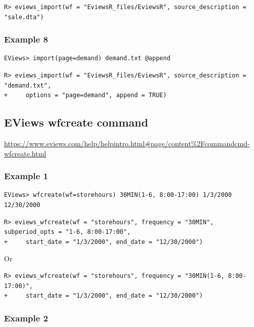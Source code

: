 \begin{verbatim}
R> eviews_import(wf = "EviewsR_files/EviewsR", source_description = "sale.dta")
\end{verbatim}

\hypertarget{example-8-1}{%
\subsubsection{Example 8}\label{example-8-1}}

\begin{verbatim}
EViews> import(page=demand) demand.txt @append
\end{verbatim}

\begin{verbatim}
R> eviews_import(wf = "EviewsR_files/EviewsR", source_description = "demand.txt",
+     options = "page=demand", append = TRUE)
\end{verbatim}

\hypertarget{eviews-wfcreate-command}{%
\subsection{EViews wfcreate command}\label{eviews-wfcreate-command}}

\url{https://www.eviews.com/help/helpintro.html\#page/content\%2Fcommandcmd-wfcreate.html}

\hypertarget{example-1-2}{%
\subsubsection{Example 1}\label{example-1-2}}

\begin{verbatim}
EViews> wfcreate(wf=storehours) 30MIN(1-6, 8:00-17:00) 1/3/2000 12/30/2000
\end{verbatim}

\begin{verbatim}
R> eviews_wfcreate(wf = "storehours", frequency = "30MIN", subperiod_opts = "1-6, 8:00-17:00",
+     start_date = "1/3/2000", end_date = "12/30/2000")
\end{verbatim}

Or

\begin{verbatim}
R> eviews_wfcreate(wf = "storehours", frequency = "30MIN(1-6, 8:00-17:00)",
+     start_date = "1/3/2000", end_date = "12/30/2000")
\end{verbatim}

\hypertarget{example-2-2}{%
\subsubsection{Example 2}\label{example-2-2}}

